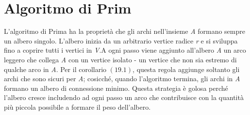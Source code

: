 \documentclass[10pt, a4paper]{report}
\begin{document}
\section{Algoritmo di Prim}
L'algoritmo di Prima ha la proprietà che gli archi nell'insieme \textit{A} formano sempre un albero singolo. L'albero inizia da un arbitrario vertice radice \textit{r} e si sviluppa fino a coprire tutti i vertici in \textit{V}.A ogni passo viene aggiunto all'albero \textit{A} un arco leggero che collega \textit{A} con un vertice isolato - un vertice che non sia estremo di qualche arco in \textit{A}. Per il corollario $(19.1)$, questa regola aggiunge soltanto gli archi che sono sicuri per \textit{A}; cosicché, quando l'algoritmo termina, gli archi in \textit{A} formano un albero di connessione minimo. Questa strategia è golosa perché l'albero cresce includendo ad ogni passo un arco che contribuisce con la quantità più piccola possibile a formare il peso dell'albero.
\end{document}
